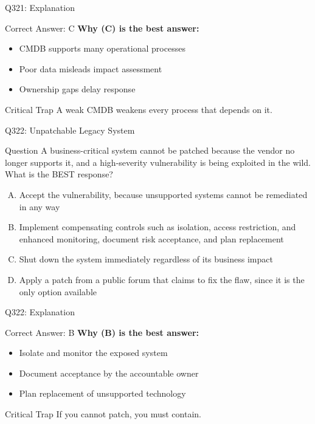 \documentclass{beamer}
\begin{document}
	\begin{frame}{Q321: Explanation}
		\begin{block}{Correct Answer: C}
			\textbf{Why (C) is the best answer:}
			\begin{itemize}
				\item CMDB supports many operational processes
				\item Poor data misleads impact assessment
				\item Ownership gaps delay response
			\end{itemize}
		\end{block}
		\begin{alertblock}{Critical Trap}
			A weak CMDB weakens every process that depends on it.
		\end{alertblock}
	\end{frame}
	
	\begin{frame}{Q322: Unpatchable Legacy System}
		\begin{block}{Question}
			\small A business-critical system cannot be patched because the vendor no longer supports it, and a high-severity vulnerability is being exploited in the wild. What is the BEST response?
		\end{block}
		\begin{enumerate}[(A)]
			\footnotesize
			\item Accept the vulnerability, because unsupported systems cannot be remediated in any way
			\item Implement compensating controls such as isolation, access restriction, and enhanced monitoring, document risk acceptance, and plan replacement
			\item Shut down the system immediately regardless of its business impact
			\item Apply a patch from a public forum that claims to fix the flaw, since it is the only option available
		\end{enumerate}
	\end{frame}
	
	\begin{frame}{Q322: Explanation}
		\begin{block}{Correct Answer: B}
			\textbf{Why (B) is the best answer:}
			\begin{itemize}
				\item Isolate and monitor the exposed system
				\item Document acceptance by the accountable owner
				\item Plan replacement of unsupported technology
			\end{itemize}
		\end{block}
		\begin{alertblock}{Critical Trap}
			If you cannot patch, you must contain.
		\end{alertblock}
	\end{frame}
	
\end{document}
